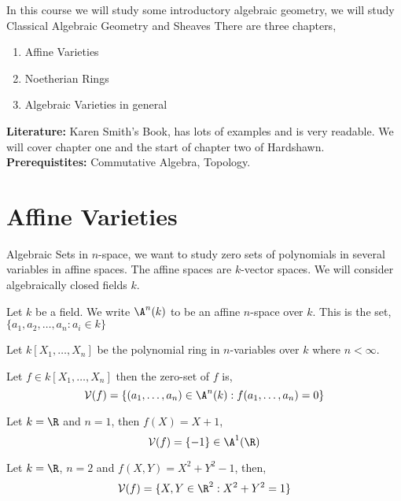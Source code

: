 
In this course we will study some introductory algebraic geometry, we will study Classical Algebraic Geometry and Sheaves
There are three chapters,
\begin{enumerate}
  \item Affine Varieties
  \item Noetherian Rings
  \item Algebraic Varieties in general
\end{enumerate}

\textbf{Literature: }Karen Smith's Book, has lots of examples and is very readable. We will cover chapter one and the start of chapter two of Hardshawn.\\

\textbf{Prerequistites: }Commutative Algebra, Topology.

\section{Affine Varieties}
Algebraic Sets in $n$-space, we want to study zero sets of polynomials in several variables in affine spaces. The affine spaces are $k$-vector spaces. We will consider algebraically closed fields $k$. \\

\begin{ndefi}
  Let $k$ be a field. We write $\A^n(k)$ to be an affine $n$-space over $k$. This is the set, $\{a_{1}, a_{2}, \dots, a_n : a_i \in k\}$\\
\end{ndefi}

Let $k[X_1, \dots, X_n]$ be the polynomial ring in $n$-variables over $k$ where $n < \infty$.
\begin{ndefi}
  Let $f \in k[X_1, \dots, X_n]$ then the zero-set of $f$ is,
  $$ \mathcal{V}(f) = \{(a_1, \dots, a_n) \in \A^n(k) : f(a_1, \dots, a_n) = 0\} $$
\end{ndefi}

\begin{eg}
  Let $k = \R$ and $n = 1$, then $f(X) = X + 1$,
  $$ \mathcal{V}(f) = \{-1\} \in \A^1(\R) $$
\end{eg}

\begin{eg}
  Let $k = \R$, $n = 2$ and $f(X, Y) = X^2 + Y^2 - 1$, then,
  $$ \mathcal{V}(f) = \{X, Y \in \R^2 : X^2 + Y^2 = 1\} $$
\end{eg}

